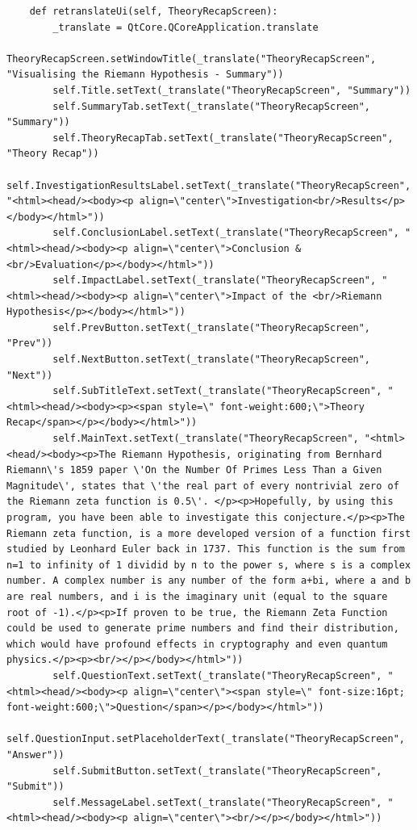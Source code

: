 \documentclass[12pt]{article}
\begin{document}
\begin{lstlisting}
    def retranslateUi(self, TheoryRecapScreen):
        _translate = QtCore.QCoreApplication.translate
        TheoryRecapScreen.setWindowTitle(_translate("TheoryRecapScreen", "Visualising the Riemann Hypothesis - Summary"))
        self.Title.setText(_translate("TheoryRecapScreen", "Summary"))
        self.SummaryTab.setText(_translate("TheoryRecapScreen", "Summary"))
        self.TheoryRecapTab.setText(_translate("TheoryRecapScreen", "Theory Recap"))
        self.InvestigationResultsLabel.setText(_translate("TheoryRecapScreen", "<html><head/><body><p align=\"center\">Investigation<br/>Results</p></body></html>"))
        self.ConclusionLabel.setText(_translate("TheoryRecapScreen", "<html><head/><body><p align=\"center\">Conclusion & <br/>Evaluation</p></body></html>"))
        self.ImpactLabel.setText(_translate("TheoryRecapScreen", "<html><head/><body><p align=\"center\">Impact of the <br/>Riemann Hypothesis</p></body></html>"))
        self.PrevButton.setText(_translate("TheoryRecapScreen", "Prev"))
        self.NextButton.setText(_translate("TheoryRecapScreen", "Next"))
        self.SubTitleText.setText(_translate("TheoryRecapScreen", "<html><head/><body><p><span style=\" font-weight:600;\">Theory Recap</span></p></body></html>"))
        self.MainText.setText(_translate("TheoryRecapScreen", "<html><head/><body><p>The Riemann Hypothesis, originating from Bernhard Riemann\'s 1859 paper \'On the Number Of Primes Less Than a Given Magnitude\', states that \'the real part of every nontrivial zero of the Riemann zeta function is 0.5\'. </p><p>Hopefully, by using this program, you have been able to investigate this conjecture.</p><p>The Riemann zeta function, is a more developed version of a function first studied by Leonhard Euler back in 1737. This function is the sum from n=1 to infinity of 1 dividid by n to the power s, where s is a complex number. A complex number is any number of the form a+bi, where a and b are real numbers, and i is the imaginary unit (equal to the square root of -1).</p><p>If proven to be true, the Riemann Zeta Function could be used to generate prime numbers and find their distribution, which would have profound effects in cryptography and even quantum physics.</p><p><br/></p></body></html>"))
        self.QuestionText.setText(_translate("TheoryRecapScreen", "<html><head/><body><p align=\"center\"><span style=\" font-size:16pt; font-weight:600;\">Question</span></p></body></html>"))
        self.QuestionInput.setPlaceholderText(_translate("TheoryRecapScreen", "Answer"))
        self.SubmitButton.setText(_translate("TheoryRecapScreen", "Submit"))
        self.MessageLabel.setText(_translate("TheoryRecapScreen", "<html><head/><body><p align=\"center\"><br/></p></body></html>"))
\end{lstlisting}
\end{document}
